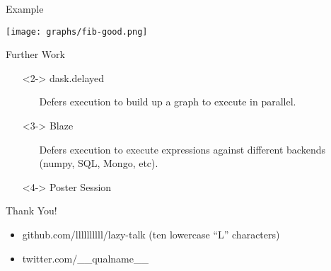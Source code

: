 \documentclass{beamer}
\begin{document}
\begin{frame}{Example}
  \begin{center}
    \texttt{[image: graphs/fib-good.png]}
  \end{center}
\end{frame}

\begin{frame}{Further Work}
  \begin{itemize}
  \item[]<2-> dask.delayed
    \begin{itemize}
    \item[] Defers execution to build up a graph to execute in parallel.
    \end{itemize}
  \item[]<3-> Blaze
    \begin{itemize}
    \item[] Defers execution to execute expressions against different backends
      (numpy, SQL, Mongo, etc).
    \end{itemize}
  \item[]<4-> Poster Session
  \end{itemize}
\end{frame}

\begin{frame}{Thank You!}
  \begin{itemize}
  \item github.com/llllllllll/lazy-talk (ten lowercase ``L'' characters)
  \item twitter.com/\_\_qualname\_\_
  \end{itemize}
\end{frame}
\end{document}
